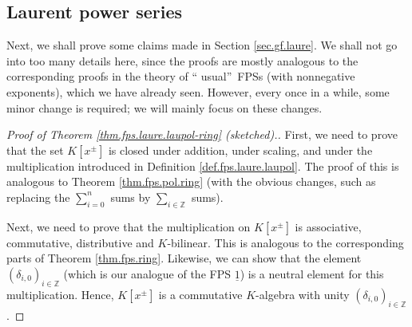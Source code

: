 \subsection{\label{sec.details.gf.laure}Laurent power series}

\begin{fineprint}
Next, we shall prove some claims made in Section \ref{sec.gf.laure}. We shall
not go into too many details here, since the proofs are mostly analogous to
the corresponding proofs in the theory of \textquotedblleft
usual\textquotedblright\ FPSs (with nonnegative exponents), which we have
already seen. However, every once in a while, some minor change is required;
we will mainly focus on these changes.

\begin{proof}
[Proof of Theorem \ref{thm.fps.laure.laupol-ring} (sketched).]First, we need
to prove that the set $K\left[  x^{\pm}\right]  $ is closed under addition,
under scaling, and under the multiplication introduced in Definition
\ref{def.fps.laure.laupol}. The proof of this is analogous to Theorem
\ref{thm.fps.pol.ring} (with the obvious changes, such as replacing the
$\sum_{i=0}^{n}$ sums by $\sum_{i\in\mathbb{Z}}$ sums).

Next, we need to prove that the multiplication on $K\left[  x^{\pm}\right]  $
is associative, commutative, distributive and $K$-bilinear. This is analogous
to the corresponding parts of Theorem \ref{thm.fps.ring}. Likewise, we can
show that the element $\left(  \delta_{i,0}\right)  _{i\in\mathbb{Z}}$ (which
is our analogue of the FPS $\underline{1}$) is a neutral element for this
multiplication. Hence, $K\left[  x^{\pm}\right]  $ is a commutative
$K$-algebra with unity $\left(  \delta_{i,0}\right)  _{i\in\mathbb{Z}}$.


\end{proof}
\end{fineprint}
